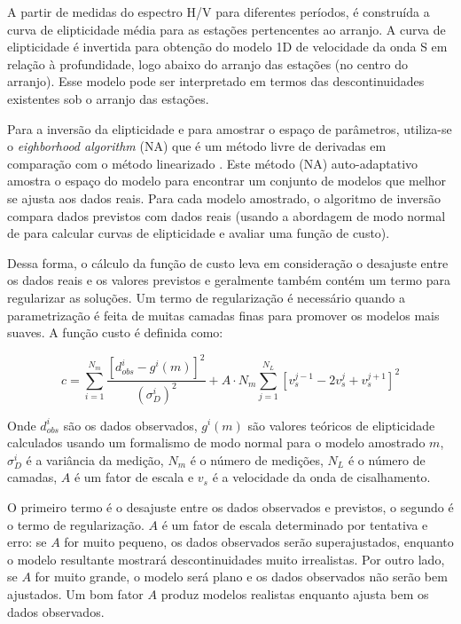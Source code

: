 \documentclass[smallextended]{svjour3}       %
\begin{document}
A partir de medidas do espectro H/V para diferentes períodos, é construída a curva de elipticidade média para as estações pertencentes ao arranjo. A curva de elipticidade é invertida para obtenção do modelo 1D de velocidade da onda S em relação à profundidade, logo abaixo do arranjo das estações (no centro do arranjo). Esse modelo pode ser interpretado em termos das descontinuidades existentes sob o arranjo das estações.

Para a inversão da elipticidade e para amostrar o espaço de parâmetros, utiliza-se o \textit{eighborhood algorithm} (NA) \citep{wathelet2008array} que é um método livre de derivadas em comparação com o método linearizado \citep{menke1989geophysical}. Este método (NA) auto-adaptativo amostra o espaço do modelo para encontrar um conjunto de modelos que melhor se ajusta aos dados reais. Para cada modelo amostrado, o algoritmo de inversão compara dados previstos com dados reais (usando a abordagem de modo normal de \cite{herrmann2013computer} para calcular curvas de elipticidade e avaliar uma função de custo). 

Dessa forma, o cálculo da função de custo leva em consideração o desajuste entre os dados reais e os valores previstos e geralmente também contém um termo para regularizar as soluções. Um termo de regularização é necessário quando a parametrização é feita de muitas camadas finas para promover os modelos mais suaves. A função custo é definida como:

\begin{equation}\label{eq:cost_function}
  c = \sum_{i=1}^{N_m} \frac{[d_{obs}^i - g^i(m)]^2}{(\sigma^i_{D})^2} + A \cdot N_m \sum_{j=1}^{N_L} [v_s^{j - 1} - 2v_s^{j} + v_s^{j + 1}]^2 
\end{equation}

Onde $d_{obs}^i$ são os dados observados, $g^i(m)$ são valores teóricos de elipticidade calculados usando um formalismo de modo normal para o modelo amostrado $m$, $\sigma^i_{D}$ é a variância da medição, $N_m$ é o número de medições, $N_L$ é o número de camadas, $A$ é um fator de escala e $v_s$ é a velocidade da onda de cisalhamento. 

O primeiro termo é o desajuste entre os dados observados e previstos, o segundo é o termo de regularização. $A$ é um fator de escala determinado por tentativa e erro: se $A$ for muito pequeno, os dados observados serão superajustados, enquanto o modelo resultante mostrará descontinuidades muito irrealistas. Por outro lado, se $A$ for muito grande, o modelo será plano e os dados observados não serão bem ajustados. Um bom fator $A$ produz modelos realistas enquanto ajusta bem os dados observados. 
\end{document}
